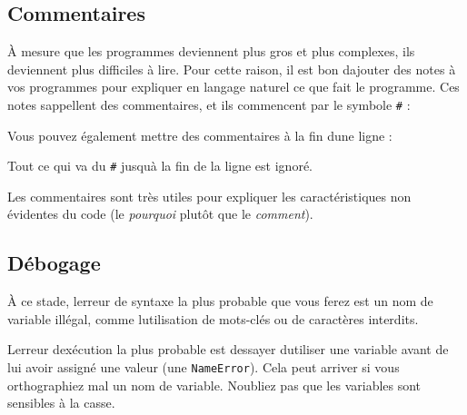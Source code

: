 \hypertarget{commentaires}{%
\subsection{Commentaires}\label{commentaires}}

À mesure que les programmes deviennent plus gros et plus complexes, ils
deviennent plus difficiles à lire. Pour cette raison, il est bon
d\textquotesingle ajouter des notes à vos programmes pour expliquer en
langage naturel ce que fait le programme. Ces notes
s\textquotesingle appellent des commentaires, et ils commencent par le
symbole \texttt{\#} :

\begin{Shaded}
\begin{Highlighting}[]
\OperatorTok{=}\OperatorTok{*} \NormalTok{) }\OperatorTok{/} 
\end{Highlighting}
\end{Shaded}

Vous pouvez également mettre des commentaires à la fin
d\textquotesingle une ligne :

\begin{Shaded}
\begin{Highlighting}[]
\OperatorTok{=}\OperatorTok{*} \NormalTok{) }\OperatorTok{/}   
\end{Highlighting}
\end{Shaded}

Tout ce qui va du \texttt{\#} jusqu\textquotesingle à la fin de la ligne
est ignoré.

Les commentaires sont très utiles pour expliquer les caractéristiques
non évidentes du code (le \emph{pourquoi} plutôt que le \emph{comment}).

\hypertarget{duxe9bogage}{%
\subsection{Débogage}\label{duxe9bogage}}

À ce stade, l\textquotesingle erreur de syntaxe la plus probable que
vous ferez est un nom de variable illégal, comme
l\textquotesingle utilisation de mots-clés ou de caractères interdits.

L\textquotesingle erreur d\textquotesingle exécution la plus probable
est d\textquotesingle essayer d\textquotesingle utiliser une variable
avant de lui avoir assigné une valeur (une \texttt{NameError}). Cela
peut arriver si vous orthographiez mal un nom de variable.
N\textquotesingle oubliez pas que les variables sont sensibles à la
casse.

